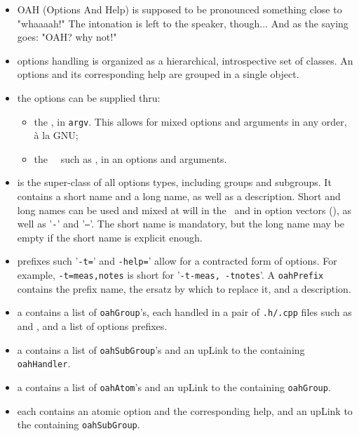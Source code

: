 \begin{itemize}
\item OAH (Options And Help) is supposed to be pronounced something close to "whaaaah!"
    The intonation is left to the speaker, though...
    And as the saying goes: "OAH? why not!"

\item options handling is organized as a hierarchical, introspective set of classes.
    An options and its corresponding help are grouped in a single object.

\item the options can be supplied thru:

\begin{itemize}
    \item the \CLI, in {\tt argv}.
        This allows for mixed options and arguments in any order, à la GNU;
    \item the \API\ \functions\ such as , in an options and arguments.
  \end{itemize}

\item {} is the super-class   of all options types, including groups and subgroups.
    It contains a short name and a long name, as well as a description.
    Short and long names can be used and mixed at will in the \CLI\
    and in option vectors (\API),
    as well as '{\tt -}' and '{\tt --}'.
    The short name is mandatory, but the long name may be empty
    if the short name is explicit enough.

\item prefixes such '{\tt -t=}' and {\tt -help=}' allow for a contracted form of options.
    For example, {\tt -t=meas,notes} is short for '{\tt -t-meas, -tnotes}'.
    A {\tt oahPrefix} contains the prefix name, the ersatz by which to replace it,
    and a description.

\item a  contains a list of {\tt oahGroup}'s, each handled
    in a pair of {\tt .h/.cpp} files such as \msr{msrOah.h} and ,
    and a list of options prefixes.

\item a  contains a list of {\tt oahSubGroup}'s
    and an upLink to the containing {\tt oahHandler}.

\item a  contains a list of {\tt oahAtom}'s
    and an upLink to the containing {\tt oahGroup}.

\item each  contains an atomic option and the corresponding help,
    and an upLink to the containing {\tt oahSubGroup}.

\end{itemize}



